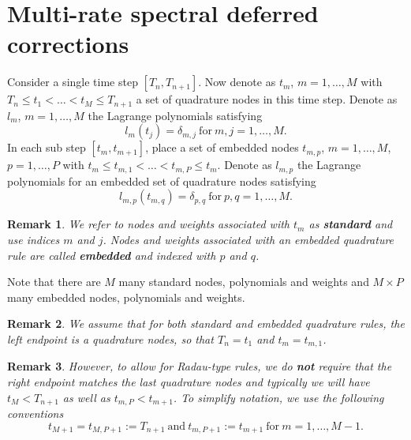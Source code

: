 \documentclass{article}
\newtheorem{remark}{Remark}
\begin{document}
\section*{Multi-rate spectral deferred corrections}
Consider a single time step $[T_{n}, T_{n+1}]$.
Now denote as $t_m$, $m=1, \ldots, M$ with $T_{n} \leq t_1 < \ldots < t_{M} \leq T_{n+1}$ a set of quadrature nodes in this time step.
Denote as $l_m$, $m=1, \ldots, M$ the Lagrange polynomials satisfying 
\begin{equation}
	l_m(t_j) = \delta_{m,j} \ \text{for} \ m,j=1, \ldots, M.
\end{equation}
In each sub step $[t_m, t_{m+1}]$, place a set of embedded nodes $t_{m,p}$, $m=1,\ldots,M$, $p=1,\ldots,P$ with $t_{m} \leq t_{m,1} < \ldots < t_{m,P} \leq t_{m}$.
Denote as $l_{m,p}$ the Lagrange polynomials for an embedded set of quadrature nodes satisfying
\begin{equation}
	l_{m,p}(t_{m,q}) = \delta_{p,q} \ \text{for} \ p,q=1,\ldots,M.
\end{equation}
\begin{remark}
We refer to nodes and weights associated with $t_m$ as \textbf{standard} and use indices $m$ and $j$.
Nodes and weights associated with an embedded quadrature rule are called \textbf{embedded} and indexed with $p$ and $q$.
\end{remark}
Note that there are $M$ many standard nodes, polynomials and weights and $M \times P$ many embedded nodes, polynomials and weights.
\begin{remark}
We assume that for both standard and embedded quadrature rules, the left endpoint is a quadrature nodes, so that $T_n = t_1$ and $t_{m} = t_{m,1}$.
\end{remark}
\begin{remark}
However, to allow for Radau-type rules, we do \textbf{not} require that the right endpoint matches the last quadrature nodes and typically we will have $t_{M} < T_{n+1}$ as well as $t_{m,P} < t_{m+1}$.
To simplify notation, we use the following conventions
\begin{equation}
	t_{M+1}  = t_{M,P+1} := T_{n+1} \ \text{and} \ t_{m,P+1} := t_{m+1} \ \text{for} \ m=1,\ldots,M-1.
\end{equation}
\end{remark}
\end{document}
